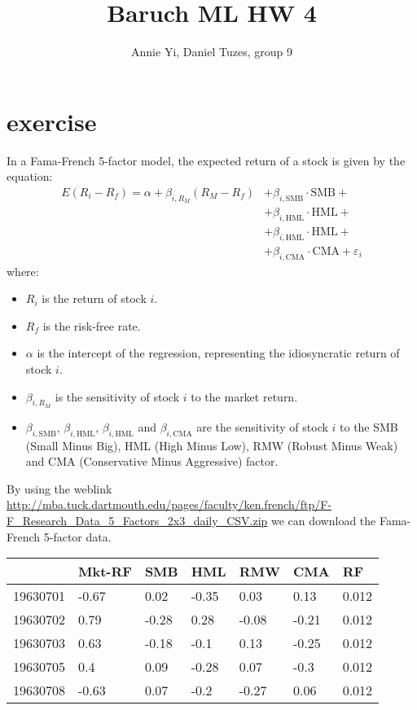 \documentclass{article}
\title{Baruch ML HW 4}
\author{Annie Yi, Daniel Tuzes, group 9}
\begin{document}
\maketitle
\section{exercise}
In a Fama-French 5-factor model, the expected return of a stock is given by the equation:
\begin{align*}
    E(R_i - R_f) = \alpha + \beta_{i,R_M} (R_M - R_f) & + \beta_{i,\text{SMB}} \cdot \text{SMB} +               \\
                                                      & + \beta_{i,\text{HML}} \cdot \text{HML} +               \\
                                                      & + \beta_{i,\text{HML}} \cdot \text{HML} +               \\
                                                      & + \beta_{i,\text{CMA}} \cdot \text{CMA} + \varepsilon_i
\end{align*}
where:

\begin{itemize}
    \item $R_i$ is the return of stock $i$.
    \item $R_f$ is the risk-free rate.
    \item $\alpha$ is the intercept of the regression, representing the idiosyncratic return of stock $i$.
    \item $\beta_{i,R_M}$ is the sensitivity of stock $i$ to the market return.
    \item $\beta_{i,\text{SMB}}$, $\beta_{i,\text{HML}}$, $\beta_{i,\text{HML}}$ and $\beta_{i,\text{CMA}}$
          are the sensitivity of stock $i$ to the
          SMB (Small Minus Big),
          HML (High Minus Low),
          RMW (Robust Minus Weak) and
          CMA (Conservative Minus Aggressive) factor.
\end{itemize}
By using the weblink
\url{http://mba.tuck.dartmouth.edu/pages/faculty/ken.french/ftp/F-F_Research_Data_5_Factors_2x3_daily_CSV.zip}
we can download the Fama-French 5-factor data.
\begin{center}
    \begin{tabular}{lllllll}
        \toprule
                 & Mkt-RF & SMB   & HML   & RMW   & CMA   & RF    \\
        \midrule
        19630701 & -0.67  & 0.02  & -0.35 & 0.03  & 0.13  & 0.012 \\
        19630702 & 0.79   & -0.28 & 0.28  & -0.08 & -0.21 & 0.012 \\
        19630703 & 0.63   & -0.18 & -0.1  & 0.13  & -0.25 & 0.012 \\
        19630705 & 0.4    & 0.09  & -0.28 & 0.07  & -0.3  & 0.012 \\
        19630708 & -0.63  & 0.07  & -0.2  & -0.27 & 0.06  & 0.012 \\
        \bottomrule
    \end{tabular}
\end{center}
\end{document}
